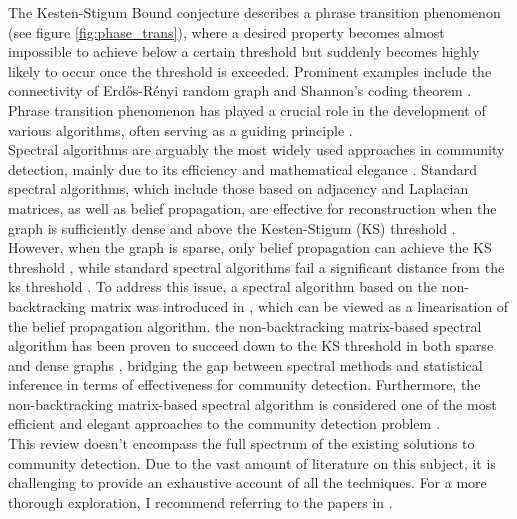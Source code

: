 The Kesten-Stigum Bound conjecture describes a phrase transition phenomenon (see figure \ref{fig:phase_trans}), where a desired property becomes almost impossible to achieve below a certain threshold but suddenly becomes highly likely to occur once the threshold is exceeded. Prominent examples include the connectivity of Erd\H{o}s-R\'{e}nyi random graph and Shannon's coding theorem \cite{shannon}. Phrase transition phenomenon has played a crucial role in the development of various algorithms, often serving as a guiding principle \cite{TheConjecture}.\\
Spectral algorithms are arguably the most widely used approaches in community detection, mainly due to its efficiency and mathematical elegance \cite{spectral_algo_review}. Standard spectral algorithms, which include those based on adjacency and Laplacian matrices, as well as belief propagation, are effective for reconstruction when the graph is sufficiently dense and above the Kesten-Stigum (KS) threshold \cite{standard_spec_in_dense}. However, when the graph is sparse, only belief propagation can achieve the KS threshold \cite{firstpaper}, while standard spectral algorithms fail a significant distance from the ks threshold \cite{standard_spec_fail}. To address this issue, a spectral algorithm based on the non-backtracking matrix was introduced in \cite{the_non-backtracking}, which can be viewed as a linearisation of the belief propagation algorithm\cite{as15c}. the non-backtracking matrix-based spectral algorithm  has been proven to succeed down to the KS threshold in both sparse and dense graphs  \cite{blm15}, bridging the gap between spectral methods and statistical inference in terms of effectiveness for community detection. Furthermore, the non-backtracking matrix-based spectral algorithm is considered one of the most efficient and elegant approaches to the community detection problem \cite{the_non-backtracking} \cite{TheConjecture}.\\
This review doesn't encompass the full spectrum of the existing solutions to community detection. Due to the vast amount of literature on this subject, it is challenging to provide an exhaustive account of all the techniques. For a more thorough exploration, I recommend referring to the papers in \cite{TheConjecture} \cite{comm_dete_in_graphs} \cite{userguide} \cite{dallamico:tel-03454227}.

